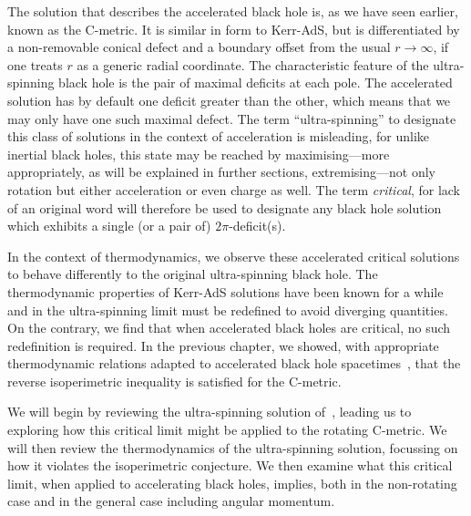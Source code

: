 \documentclass[
twoside,
openright,
frontopenright
]{dmathesis}
\begin{document}
The solution that describes the accelerated black hole is, as we have seen
earlier, known as the C-metric. It is similar in form to Kerr-AdS, but is
differentiated by a non-removable conical defect and a boundary offset from the
usual $r\to\infty$, if one treats $r$ as a generic radial coordinate. The
characteristic feature of the ultra-spinning black hole is the pair of maximal
deficits at each pole. The accelerated solution has by default one deficit
greater than the other, which means that we may only have one such maximal
defect. The term ``ultra-spinning'' to designate this class of solutions in the
context of acceleration is misleading, for unlike inertial black holes, this
state may be reached by maximising---more appropriately, as will be explained in
further sections, extremising---not only rotation but either acceleration or
even charge as well. The term \emph{critical}, for lack of an original word will
therefore be used to designate any black hole solution which exhibits a single
(or a pair of) $2\pi$-deficit(s).

In the context of thermodynamics, we observe these accelerated critical
solutions to behave differently to the original ultra-spinning black hole. The
thermodynamic properties of Kerr-AdS solutions have been known for a
while~\cite{Gibbons:2004ai, Silva:2002jq, Caldarelli:1999xj, Hawking:1998kw,
  Kostelecky:1995ei, Hawking:1982dh} and in the ultra-spinning limit must be
redefined to avoid diverging quantities. On the contrary, we find that when
accelerated black holes are critical, no such redefinition is required. In the
previous chapter, we showed, with appropriate thermodynamic relations adapted to
accelerated black hole spacetimes~\cite{Appels:2016uha,Appels:2017xoe}, that the
reverse isoperimetric inequality is satisfied for the C-metric.

We will begin by reviewing the ultra-spinning solution
of~\cite{Caldarelli:1999xj,Klemm:2014rda,Hennigar:2014cfa}, leading us to
exploring how this critical limit might be applied to the rotating C-metric. We
will then review the thermodynamics of the ultra-spinning solution, focussing on
how it violates the isoperimetric conjecture. We then examine what this critical
limit, when applied to accelerating black holes, implies, both in the
non-rotating case and in the general case including angular momentum.
\end{document}
